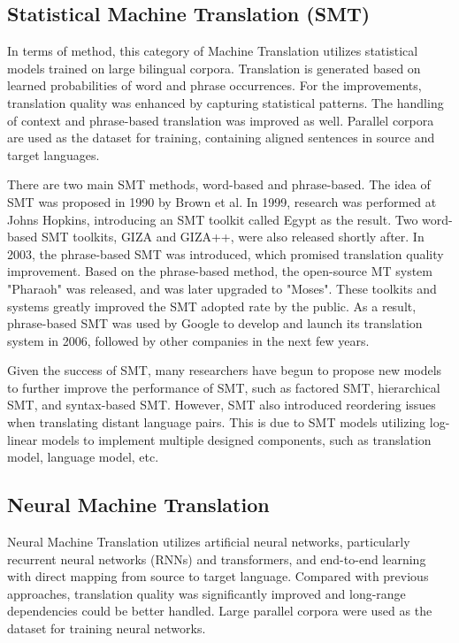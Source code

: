 \documentclass[sigconf]{acmart}
\begin{document}
    \subsection{Statistical Machine Translation (SMT)}
        In terms of method, this category of Machine Translation utilizes statistical models trained on large bilingual corpora. Translation is generated based on learned probabilities of word and phrase occurrences. For the improvements, translation quality was enhanced by capturing statistical patterns. The handling of context and phrase-based translation was improved as well. Parallel corpora are used as the dataset for training, containing aligned sentences in source and target languages.

        There are two main SMT methods, word-based and phrase-based. The idea of SMT was proposed in 1990 by Brown et al. In 1999, research was performed at Johns Hopkins, introducing an SMT toolkit called Egypt as the result. Two word-based SMT toolkits, GIZA and GIZA++, were also released shortly after. In 2003, the phrase-based SMT was introduced, which promised translation quality improvement. Based on the phrase-based method, the open-source MT system "Pharaoh" was released, and was later upgraded to "Moses". These toolkits and systems greatly improved the SMT adopted rate by the public. As a result, phrase-based SMT was used by Google to develop and launch its translation system in 2006, followed by other companies in the next few years\cite{Wang_Wu_He_Huang_Church_2021}.

        Given the success of SMT, many researchers have begun to propose new models to further improve the performance of SMT, such as factored SMT, hierarchical SMT, and syntax-based SMT. However, SMT also introduced reordering issues when translating distant language pairs. This is due to SMT models utilizing log-linear models to implement multiple designed components, such as translation model, language model, etc\cite{Wang_Wu_He_Huang_Church_2021}.
        
    \subsection{Neural Machine Translation}
        Neural Machine Translation utilizes artificial neural networks, particularly recurrent neural networks (RNNs) and transformers, and end-to-end learning with direct mapping from source to target language. Compared with previous approaches, translation quality was significantly improved and long-range dependencies could be better handled. Large parallel corpora were used as the dataset for training neural networks.
        
\end{document}
